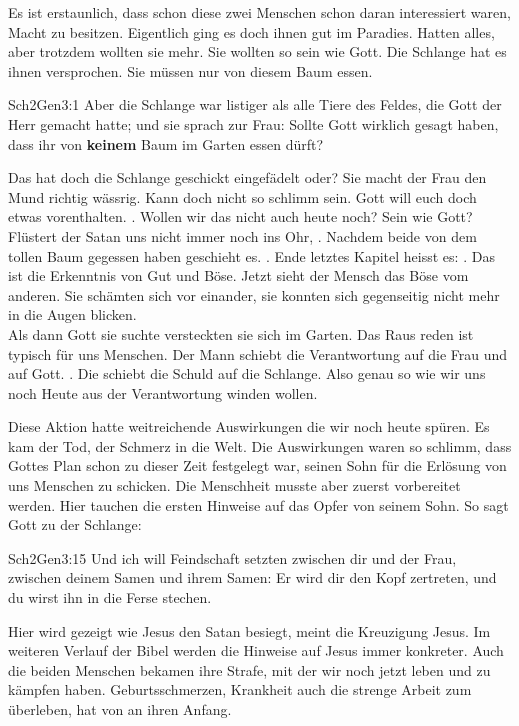 Es ist erstaunlich, dass schon diese zwei Menschen schon daran interessiert waren, Macht zu besitzen. Eigentlich ging es doch ihnen gut im Paradies. Hatten alles, aber trotzdem wollten sie mehr. Sie wollten so sein wie Gott. Die Schlange hat es ihnen versprochen. Sie müssen nur von diesem Baum essen.
\begin{bibeltext}{Sch2}{Gen}{3:1}
	Aber die Schlange war listiger als alle Tiere des Feldes, die Gott der Herr gemacht hatte; und sie sprach zur Frau: Sollte Gott wirklich gesagt haben, dass ihr von \textbf{keinem} Baum im Garten essen dürft?
\end{bibeltext}
Das hat doch die Schlange geschickt eingefädelt oder? Sie macht der Frau den Mund richtig wässrig. Kann doch nicht so schlimm sein. Gott will euch doch etwas vorenthalten. . Wollen wir das nicht auch heute noch? Sein wie Gott? Flüstert der Satan uns nicht immer noch ins Ohr, .
Nachdem beide von dem tollen Baum gegessen haben geschieht es. . Ende letztes Kapitel heisst es: . Das ist die Erkenntnis von Gut und Böse. Jetzt sieht der Mensch das Böse vom anderen. Sie schämten sich vor einander, sie konnten sich gegenseitig nicht mehr in die Augen blicken.\\
Als dann Gott sie suchte versteckten sie sich im Garten. Das Raus reden ist typisch für uns Menschen. Der Mann schiebt die Verantwortung auf die Frau und auf Gott. . Die schiebt die Schuld auf die Schlange. Also genau so wie wir uns noch Heute aus der Verantwortung winden wollen.

Diese Aktion hatte weitreichende Auswirkungen die wir noch heute spüren. Es kam der Tod, der Schmerz in die Welt. Die Auswirkungen waren so schlimm, dass Gottes Plan schon zu dieser Zeit festgelegt war, seinen Sohn für die Erlösung von uns Menschen zu schicken. Die Menschheit musste aber zuerst vorbereitet werden. Hier tauchen die ersten Hinweise auf das Opfer von seinem Sohn. So sagt Gott zu der Schlange:
\begin{bibeltext}{Sch2}{Gen}{3:15}
	Und ich will Feindschaft setzten zwischen dir und der Frau, zwischen deinem Samen und ihrem Samen: Er wird dir den Kopf zertreten, und du wirst ihn in die Ferse stechen.
\end{bibeltext}
Hier wird gezeigt wie Jesus den Satan besiegt,  meint die Kreuzigung Jesus. Im weiteren Verlauf der Bibel werden die Hinweise auf Jesus immer konkreter.
Auch die beiden Menschen bekamen ihre Strafe, mit der wir noch jetzt leben und zu kämpfen haben. Geburtsschmerzen, Krankheit auch die strenge Arbeit zum überleben, hat von an ihren Anfang.


